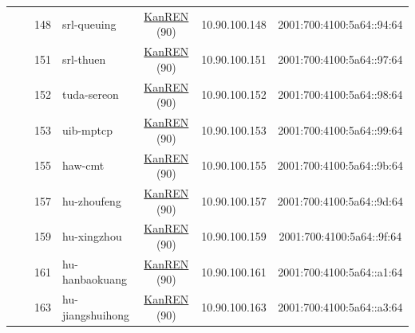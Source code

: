 \begin{small}
\begin{center}
\begin{longtable}{|c|c|c|c|c|c|c|c|}
  &  & \tiny{148} & \multicolumn{1}{|l|}{\tiny{srl-queuing}} & \multicolumn{2}{|c|}{\tiny{\href{http://www.kanren.net}{KanREN} (90)}} & \tiny{10.90.100.148} & \tiny{2001:700:4100:5a64::94:64} \\* \cline{3-3}\cline{4-4}\cline{5-5}\cline{6-6}\cline{7-7}\cline{8-8}
  &  & \tiny{151} & \multicolumn{1}{|l|}{\tiny{srl-thuen}} & \multicolumn{2}{|c|}{\tiny{\href{http://www.kanren.net}{KanREN} (90)}} & \tiny{10.90.100.151} & \tiny{2001:700:4100:5a64::97:64} \\* \cline{3-3}\cline{4-4}\cline{5-5}\cline{6-6}\cline{7-7}\cline{8-8}
  &  & \tiny{152} & \multicolumn{1}{|l|}{\tiny{tuda-sereon}} & \multicolumn{2}{|c|}{\tiny{\href{http://www.kanren.net}{KanREN} (90)}} & \tiny{10.90.100.152} & \tiny{2001:700:4100:5a64::98:64} \\* \cline{3-3}\cline{4-4}\cline{5-5}\cline{6-6}\cline{7-7}\cline{8-8}
  &  & \tiny{153} & \multicolumn{1}{|l|}{\tiny{uib-mptcp}} & \multicolumn{2}{|c|}{\tiny{\href{http://www.kanren.net}{KanREN} (90)}} & \tiny{10.90.100.153} & \tiny{2001:700:4100:5a64::99:64} \\* \cline{3-3}\cline{4-4}\cline{5-5}\cline{6-6}\cline{7-7}\cline{8-8}
  &  & \tiny{155} & \multicolumn{1}{|l|}{\tiny{haw-cmt}} & \multicolumn{2}{|c|}{\tiny{\href{http://www.kanren.net}{KanREN} (90)}} & \tiny{10.90.100.155} & \tiny{2001:700:4100:5a64::9b:64} \\* \cline{3-3}\cline{4-4}\cline{5-5}\cline{6-6}\cline{7-7}\cline{8-8}
  &  & \tiny{157} & \multicolumn{1}{|l|}{\tiny{hu-zhoufeng}} & \multicolumn{2}{|c|}{\tiny{\href{http://www.kanren.net}{KanREN} (90)}} & \tiny{10.90.100.157} & \tiny{2001:700:4100:5a64::9d:64} \\* \cline{3-3}\cline{4-4}\cline{5-5}\cline{6-6}\cline{7-7}\cline{8-8}
  &  & \tiny{159} & \multicolumn{1}{|l|}{\tiny{hu-xingzhou}} & \multicolumn{2}{|c|}{\tiny{\href{http://www.kanren.net}{KanREN} (90)}} & \tiny{10.90.100.159} & \tiny{2001:700:4100:5a64::9f:64} \\* \cline{3-3}\cline{4-4}\cline{5-5}\cline{6-6}\cline{7-7}\cline{8-8}
  &  & \tiny{161} & \multicolumn{1}{|l|}{\tiny{hu-hanbaokuang}} & \multicolumn{2}{|c|}{\tiny{\href{http://www.kanren.net}{KanREN} (90)}} & \tiny{10.90.100.161} & \tiny{2001:700:4100:5a64::a1:64} \\* \cline{3-3}\cline{4-4}\cline{5-5}\cline{6-6}\cline{7-7}\cline{8-8}
  &  & \tiny{163} & \multicolumn{1}{|l|}{\tiny{hu-jiangshuihong}} & \multicolumn{2}{|c|}{\tiny{\href{http://www.kanren.net}{KanREN} (90)}} & \tiny{10.90.100.163} & \tiny{2001:700:4100:5a64::a3:64} \\* \cline{3-3}\cline{4-4}\cline{5-5}\cline{6-6}\cline{7-7}\cline{8-8}

\end{longtable}
\end{center}
\end{small}
